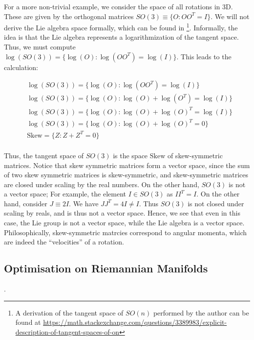 \documentclass[11pt]{book}
\newcommand{\skewsym}{\mathrm{Skew}}
\begin{document}
For a more non-trivial example, we consider the space of all rotations in 3D. These are given
by the orthogonal matrices $SO(3) \equiv \{ O : O O ^T = I \}$. We will not derive the Lie algebra
space formally, which can be found in \cite{absil2009optimisation} \footnote{A derivation of the tangent space of $SO(n)$
performed by the author can be found at \url{https://math.stackexchange.com/questions/3389983/explicit-description-of-tangent-spaces-of-on}}.
Informally, the idea is that the Lie algebra represents a logarithmization of the tangent space. Thus,
we must compute $\log(SO(3)) = \{ \log(O): \log(O O^T) = \log(I) \}$. This leads to the calculation:

\begin{align*}
&\log(SO(3)) = \{ \log(O): \log(O O^T) = \log(I) \} \\
&\log(SO(3)) = \{ \log(O): \log(O) + \log(O^T) = \log(I) \} \\
&\log(SO(3)) = \{ \log(O): \log(O) + \log(O)^T = \log(I) \} \\
&\log(SO(3)) = \{ \log(O): \log(O) + \log(O)^T = 0 \} \\
&\skewsym = \{ Z: Z + Z^T = 0 \} \\
\end{align*}

Thus, the tangent space of $SO(3)$ is the space $\skewsym$ of skew-symmetric matrices. Notice that skew symmetric
matrices form a vector space, since the sum of two skew symmetric matrices is skew-symmetric, and skew-symmetric
matrices are closed under scaling by the real numbers. On the other hand, $SO(3)$ is not a vector space; For example,
the element $I \in SO(3)$ as $I I^T = I$. On the other hand, consider $J \equiv 2I$. We have
$J J^T = 4I \neq I$. Thus $SO(3)$ is not closed under scaling by reals, and is thus not a vector space. Hence,
we see that even in this case, the Lie group is not a vector space, while the Lie algebra is a vector space.
Philosophically, skew-symmetric matrcies correspond to angular momenta, which are indeed the ``velocities''
of a rotation.



\subsection{Optimisation on Riemannian Manifolds}
\label{section:optim-on-riem}.
\end{document}
